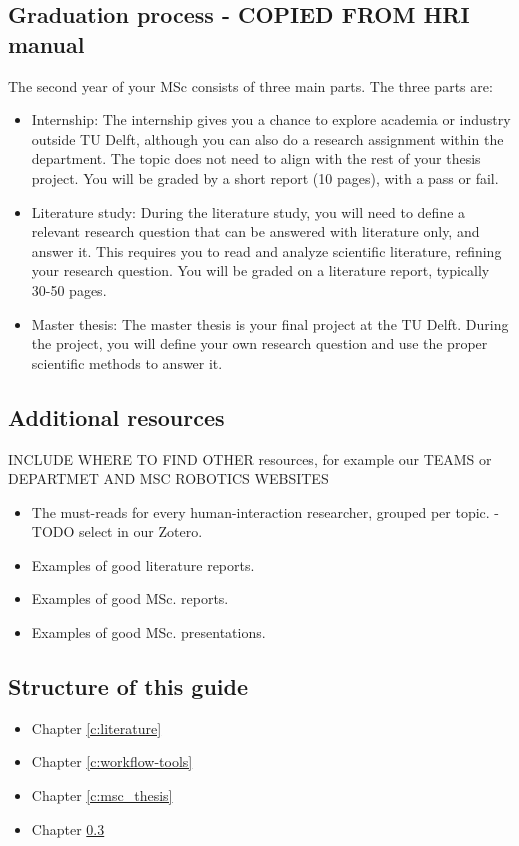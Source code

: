 \subsection{Graduation process - COPIED FROM HRI manual}
The second year of your MSc consists of three main parts. The three parts are:

\begin{itemize}
    \item Internship: The internship gives you a chance to explore academia or industry outside TU Delft, although you can also do a research assignment within the department. The topic does not need to align with the rest of your thesis project. You will be graded by a short report (10 pages), with a pass or fail.
    \item Literature study: During the literature study, you will need to define a relevant research question that can be answered with literature only, and answer it. This requires you to read and analyze scientific literature, refining your research question. You will be graded on a literature report, typically 30-50 pages.

    \item Master thesis: The master thesis is your final project at the TU Delft. During the project, you will define your own research question and use the proper scientific methods to answer it.

\end{itemize}

\subsection{Additional resources}
INCLUDE WHERE TO FIND OTHER resources, for example our TEAMS or DEPARTMET AND MSC ROBOTICS WEBSITES

\begin{itemize}
    \item The must-reads for every human-interaction researcher, grouped per topic. - TODO select in our Zotero.
    \item Examples of good literature reports.
    \item Examples of good MSc. reports.
    \item Examples of good MSc. presentations.
\end{itemize}

\subsection{Structure of this guide}

\begin{itemize}
    \item Chapter \ref{c:literature}
    \item Chapter \ref{c:workflow-tools}
    \item Chapter \ref{c:msc_thesis}
    \item Chapter \ref{}
\end{itemize}